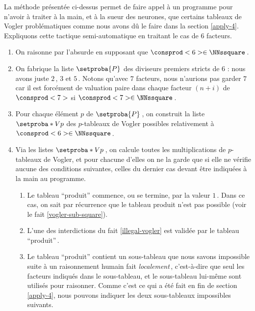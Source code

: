 La méthode présentée ci-dessus permet de faire appel à un programme pour n'avoir à traiter à la main, et à la sueur des neurones, que certains tableaux de Vogler problématiques comme nous avons dû le faire dans la section \ref{apply-4}.
Expliquons cette tactique semi-automatique en traitant le cas de $6$ facteurs.


\begin{enumerate}
	\item On raisonne par l'absurde en supposant que $\consprod<6> \in \NNssquare$\,.
	
 
	\item On fabrique la liste $\setproba{P}$ des diviseurs premiers stricts de $6$ : nous avons juste $2$\,, $3$ et $5$\,.
	Notons qu'avec $7$ facteurs, nous n'aurions pas garder $7$ car il est forcément de valuation paire dans chaque facteur $(n + i)$ de $\consprod<7>$ si $\consprod<7> \in \NNssquare$\,.
	
 
	\item Pour chaque élément $p$ de $\setproba{P}$\,, on construit la liste $\setproba*{V}{p}$ des $p$-tableaux de Vogler possibles relativement à $\consprod<6> \in \NNssquare$\,.
	
 
	\item Via les listes $\setproba*{V}{p}$\,, on calcule toutes les multiplications de $p$-tableaux de Vogler, et pour chacune d'elles on ne la garde que si elle ne vérifie aucune des conditions suivantes, celles du dernier cas devant être indiquées à la main au programme.
	\begin{enumerate}
		\item Le tableau \enquote{produit} commence, ou se termine, par la valeur $1$\,. Dans ce cas, on sait par récurrence que le tableau produit n'est pas possible (voir le fait \ref{vogler-sub-square}). 

		\item L'une des interdictions du fait \ref{illegal-vogler} est validée par le tableau \enquote{produit}\,.
		
		\item Le tableau \enquote{produit} contient un sous-tableau que nous savons impossible suite à un raisonnement humain fait \emph{localement}\,, c'est-à-dire que seul les facteurs indiqués dans le sous-tableau, et le sous-tableau lui-même sont utilisés pour raisonner.
		Comme c'est ce qui a été fait en fin de section \ref{apply-4}, nous pouvons indiquer les deux sous-tableaux impossibles suivants.
	\end{enumerate}
\end{enumerate}

